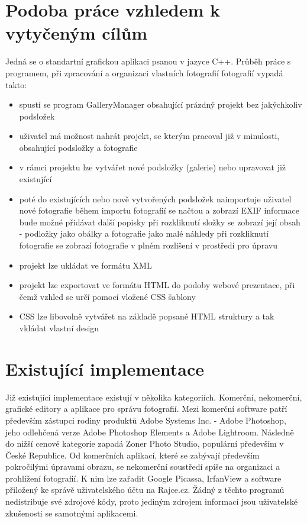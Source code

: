 \documentclass[11pt,twoside,a4paper]{book}
\begin{document}
\section{Podoba práce vzhledem k vytyčeným cílům}
\noindent
Jedná se o standartní grafickou aplikaci psanou v jazyce C++. Průběh práce s programem, při zpracování a organizaci vlastních fotografií fotografií vypadá takto:
\begin{itemize}
\item spustí se program GalleryManager obsahující prázdný projekt bez jakýchkoliv podsložek
\item uživatel má možnost nahrát projekt, se kterým pracoval již v minulosti, obsahující podsložky a fotografie
\item v rámci projektu lze vytvářet nové podsložky (galerie) nebo upravovat již existující
\item poté do existujících nebo nově vytvořených podsložek naimportuje uživatel nové fotografie
	\subitem během importu fotografií se načtou a zobrazí EXIF informace
	\subitem bude možné přidávat další popisky
	\subitem při rozkliknutí složky se zobrazí její obsah - podložky jako obálky a fotografie jako malé náhledy
	\subitem při rozkliknutí fotografie se zobrazí fotografie v plném rozlišení v prostředí pro úpravu
\item projekt lze ukládat ve formátu XML
\item projekt lze exportovat ve formátu HTML do podoby webové prezentace, při čemž vzhled se určí pomocí vložené CSS šablony
\item CSS lze libovolně vytvářet na základě popsané HTML struktury a tak vkládat vlastní design
\end{itemize}

\section{Existující implementace}
\noindent
Již existující implementace existují v několika kategoriích. Komerční, nekomerční, grafické editory a aplikace pro správu fotografií. Mezi komerční software patří především zástupci rodiny produktů Adobe Systems Inc. - Adobe Photoshop, jeho odlehčená verze Adobe Photoshop Elements a Adobe Lightroom. Následně do nižší cenové kategorie zapadá Zoner Photo Studio, populární především v České Republice. Od komerčních aplikací, které se zabývají především pokročilými úpravami obrazu, se nekomerční soustředí spíše na organizaci a prohlížení fotografií. K nim lze zařadit Google Picassa, IrfanView a software přiložený ke správě uživatelského účtu na Rajce.cz. Žádný z těchto programů nedistribuje své zdrojové kódy, proto jediným zdrojem informací jsou uživatelské zkušenosti se samotnými aplikacemi.
\end{document}
